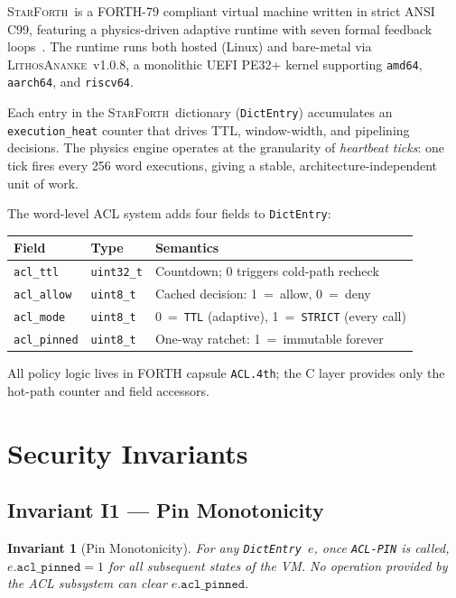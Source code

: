 \documentclass[11pt,letterpaper,openany]{article}
\newtheorem{invariant}{Invariant}
\newcommand{\SF}{\textsc{StarForth}\xspace}
\newcommand{\LK}{\textsc{LithosAnanke}\xspace}
\newcommand{\acl}[1]{\texttt{#1}}
\begin{document}
\SF\ is a FORTH-79 compliant virtual machine written in strict ANSI
C99, featuring a physics-driven adaptive runtime with seven formal
feedback loops~\cite{james2025ssrn}.  The runtime runs both hosted
(Linux) and bare-metal via \LK\ v1.0.8, a monolithic UEFI PE32+
kernel supporting \texttt{amd64}, \texttt{aarch64}, and
\texttt{riscv64}.

Each entry in the \SF\ dictionary (\texttt{DictEntry}) accumulates an
\texttt{execution\_heat} counter that drives TTL, window-width, and
pipelining decisions.  The physics engine operates at the granularity
of \emph{heartbeat ticks}: one tick fires every 256 word executions,
giving a stable, architecture-independent unit of work.

The word-level ACL system adds four fields to \texttt{DictEntry}:

\begin{center}
\begin{tabular}{llp{8.5cm}}
\toprule
\textbf{Field} & \textbf{Type} & \textbf{Semantics} \\
\midrule
\texttt{acl\_ttl}    & \texttt{uint32\_t} & Countdown; 0 triggers cold-path recheck \\
\texttt{acl\_allow}  & \texttt{uint8\_t}  & Cached decision: 1~=~allow, 0~=~deny \\
\texttt{acl\_mode}   & \texttt{uint8\_t}  & 0~=~\texttt{TTL} (adaptive), 1~=~\texttt{STRICT} (every call) \\
\texttt{acl\_pinned} & \texttt{uint8\_t}  & One-way ratchet: 1~=~immutable forever \\
\bottomrule
\end{tabular}
\end{center}

All policy logic lives in FORTH capsule \texttt{ACL.4th}; the C layer
provides only the hot-path counter and field accessors.

\section{Security Invariants}
\label{sec:invariants}

\subsection{Invariant I1 — Pin Monotonicity}

\begin{invariant}[Pin Monotonicity]
\label{inv:pin}
For any \texttt{DictEntry}~$e$, once \acl{ACL-PIN} is called,
$e.\texttt{acl\_pinned} = 1$ for all subsequent states of the VM.
No operation provided by the ACL subsystem can clear
$e.\texttt{acl\_pinned}$.
\end{invariant}
\end{document}
